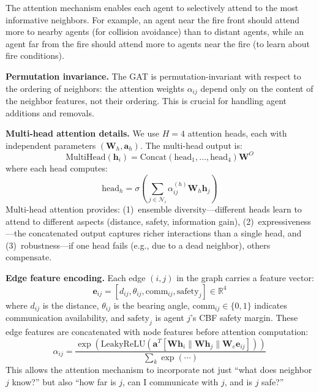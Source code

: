 \documentclass[12pt,a4paper]{article}
\DeclareRobustCommand{\cN}{\mathcal{N}}
\DeclareRobustCommand{\R}{\mathbb{R}}
\DeclareRobustCommand{\vect}[1]{\bm{#1}}
\DeclareRobustCommand{\mat}[1]{\bm{#1}}
\newcommand{\LeakyReLU}{\mathrm{LeakyReLU}}
\begin{document}
The attention mechanism enables each agent to selectively attend to the most informative neighbors. For example, an agent near the fire front should attend more to nearby agents (for collision avoidance) than to distant agents, while an agent far from the fire should attend more to agents near the fire (to learn about fire conditions).

\textbf{Permutation invariance.} The GAT is permutation-invariant with respect to the ordering of neighbors: the attention weights $\alpha_{ij}$ depend only on the content of the neighbor features, not their ordering. This is crucial for handling agent additions and removals.

\textbf{Multi-head attention details.} We use $H = 4$ attention heads, each with independent parameters $(\mat{W}_h, \vect{a}_h)$. The multi-head output is:
\begin{equation}
    \text{MultiHead}(\vect{h}_i) = \text{Concat}(\text{head}_1, \ldots, \text{head}_4) \mat{W}^O
\end{equation}
where each head computes:
\begin{equation}
    \text{head}_h = \sigma\left(\sum_{j \in \cN_i} \alpha_{ij}^{(h)} \mat{W}_h \vect{h}_j\right)
\end{equation}
Multi-head attention provides: (1)~ensemble diversity---different heads learn to attend to different aspects (distance, safety, information gain), (2)~expressiveness---the concatenated output captures richer interactions than a single head, and (3)~robustness---if one head fails (e.g., due to a dead neighbor), others compensate.

\textbf{Edge feature encoding.} Each edge $(i, j)$ in the graph carries a feature vector:
\begin{equation}
    \vect{e}_{ij} = [d_{ij}, \theta_{ij}, \text{comm}_{ij}, \text{safety}_j] \in \R^4
\end{equation}
where $d_{ij}$ is the distance, $\theta_{ij}$ is the bearing angle, $\text{comm}_{ij} \in \{0, 1\}$ indicates communication availability, and $\text{safety}_j$ is agent $j$'s CBF safety margin. These edge features are concatenated with node features before attention computation:
\begin{equation}
    \alpha_{ij} = \frac{\exp(\LeakyReLU(\vect{a}^T [\mat{W}\vect{h}_i \| \mat{W}\vect{h}_j \| \mat{W}_e \vect{e}_{ij}]))}{\sum_k \exp(\cdots)}
\end{equation}
This allows the attention mechanism to incorporate not just ``what does neighbor $j$ know?'' but also ``how far is $j$, can I communicate with $j$, and is $j$ safe?''
\end{document}
